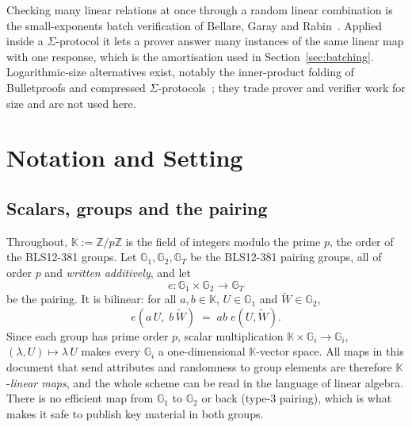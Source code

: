 \documentclass[10pt,a5paper]{article}
\newcommand{\K}[1]{#1}                      %
\newcommand{\Go}[1]{#1}                     %
\newcommand{\Gt}[1]{\tilde{#1}}             %
\newcommand{\GT}[1]{#1}                     %
\newcommand{\K}[1]{{\color{ScalarCol}#1}}   %
\newcommand{\Go}[1]{{\color{GoneCol}#1}}    %
\newcommand{\Gt}[1]{{\color{GtwoCol}#1}}    %
\newcommand{\GT}[1]{{\color{GtCol}#1}}      %
\newcommand{\F}{\mathbb{K}}
\newcommand{\GG}[1]{\mathbb{G}_{#1}}
\begin{document}
Checking many linear relations at once through a random linear combination is
the small-exponents batch verification of Bellare, Garay and
Rabin~\cite{bgr98}. Applied inside a $\Sigma$-protocol it lets a prover answer
many instances of the same linear map with one response, which is the
amortisation used in Section~\ref{sec:batching}. Logarithmic-size alternatives
exist, notably the inner-product folding of Bulletproofs and compressed
$\Sigma$-protocols~\cite{acf21}; they trade prover and verifier work for size
and are not used here.

\section{Notation and Setting}
\label{sec:notation}

\subsection{Scalars, groups and the pairing}

Throughout, $\F := \mathbb{Z}/p\mathbb{Z}$ is the field of integers modulo the
prime $p$, the order of the BLS12-381 groups. Let $\GG{1}, \GG{2}, \GG{T}$ be the
BLS12-381 pairing groups, all of order $p$ and \emph{written additively}, and let
\[
  e : \GG{1} \times \GG{2} \to \GG{T}
\]
be the pairing. It is bilinear: for all $\K{a},\K{b} \in \F$,
$\Go{U} \in \GG{1}$ and $\Gt{W} \in \GG{2}$,
\[
  e(\K{a}\,\Go{U},\; \K{b}\,\Gt{W}) \;=\; \K{ab}\; \GT{e(\Go{U}, \Gt{W})} .
\]
Since each group has prime order $p$, scalar multiplication
$\F \times \GG{i} \to \GG{i}$, $(\K{\lambda}, \Go{U}) \mapsto \K{\lambda}\,\Go{U}$
makes every $\GG{i}$ a one-dimensional $\F$-vector space. All maps in this
document that send attributes and randomness to group elements are therefore
$\F$-\emph{linear maps}, and the whole scheme can be read in the language of
linear algebra. There is no efficient map from $\GG{1}$ to $\GG{2}$ or back
(type-3 pairing), which is what makes it safe to publish key material in both
groups.
\end{document}
